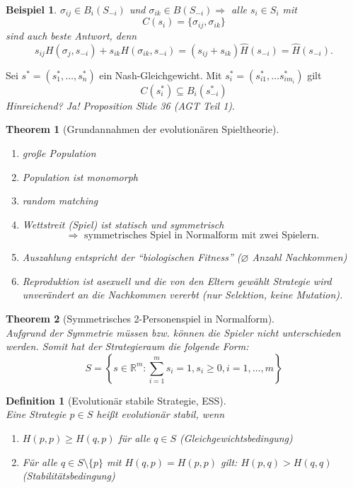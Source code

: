 \documentclass[12pt]{extreport} %
\newcommand{\R}{\mathbb{R}}
\theoremstyle{named}
\newtheorem{unnamedtheorem}{Theorem} \counterwithin{unnamedtheorem}{chapter}
\theoremstyle{itshape}
\newtheorem*{definition}{Definition}
\theoremstyle{normal}
\newtheorem*{beispiel*}{Beispiel}
\begin{document}
  
\begin{beispiel*}
	$\sigma_{ij} \in B_{i}(S_{-i})$ und $\sigma_{ik} \in B(S_{-i}) \Rightarrow$ alle $s_{i} \in S_{i}$ mit
	$$ C(s_{i}) = \{ \sigma_{ij}, \sigma_{ik} \} $$	
	sind auch beste Antwort, denn
	$$ s_{ij} H(\sigma_{j}, s_{-i}) + s_{ik} H(\sigma_{ik}, s_{-i}) = (s_{ij} + s_{ik}) \hat{H}(s_{-i}) = \hat{H}(s_{-i}). $$
\end{beispiel*}

Sei $s^{*} = \left( s_{1}^{*}, \dotsc, s_{n}^{*} \right)$ ein Nash-Gleichgewicht. Mit $s_{i}^{*} = (s_{i1}^{*}, \dotsc s_{im_{i}}^{*})$ gilt
$$ C(s_{i}^{*}) \subseteq B_{i}(s_{-i}^{*}) $$
 \textit{Hinreichend? Ja! Proposition Slide 36 (AGT Teil 1)}. ~\newpage


\begin{unnamedtheorem}[Grundannahmen der evolutionären Spieltheorie] ~\
	\begin{enumerate}
		\item große Population
		\item Population ist monomorph
		\item random matching
		\item Wettstreit (Spiel) ist statisch und symmetrisch
			$$ \Rightarrow \text{ symmetrisches Spiel in Normalform mit zwei Spielern}. $$
		\item Auszahlung entspricht der \enquote{biologischen Fitness} ($\varnothing$ Anzahl Nachkommen)
		\item Reproduktion ist asexuell und die von den Eltern gewählt Strategie wird unverändert an die Nachkommen vererbt (nur Selektion, keine Mutation).
	\end{enumerate}
\end{unnamedtheorem} 
 

\begin{unnamedtheorem}[Symmetrisches 2-Personenspiel in Normalform] ~\\
Aufgrund der Symmetrie müssen bzw. können die Spieler nicht unterschieden werden. Somit hat der Strategieraum die folgende Form:
	$$ S = \left\{ s\in \R^{m} : \sum_{i=1}^{m} s_{i} = 1, s_{i} \geq 0, i = 1, \dotsc, m \right\} $$
\end{unnamedtheorem}
  
 
\begin{definition}[Evolutionär stabile Strategie, ESS] ~\\
	Eine Strategie $p \in S$ hei{\ss}t evolutionär stabil, wenn
	\begin{enumerate}
		\item $H(p,p) \geq H(q, p)$ für alle $q \in S$ (Gleichgewichtsbedingung)
		\item Für alle $q \in S \setminus \{ p \}$ mit $H(q, p) = H(p, p)$ gilt: $H(p, q) > H(q, q)$ (Stabilitätsbedingung)
	\end{enumerate}
\end{definition}  ~\newpage
\end{document}
